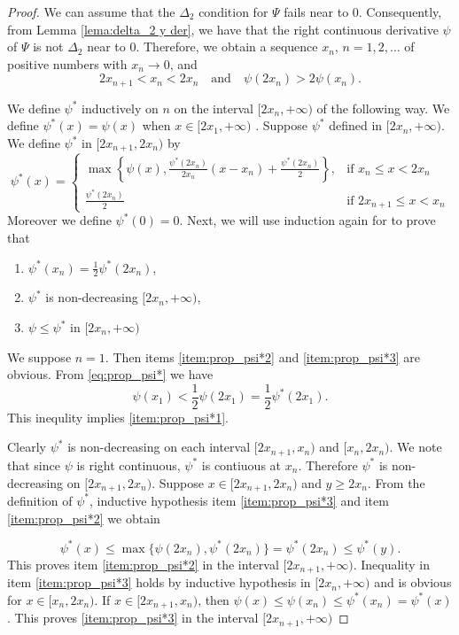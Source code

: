 \documentclass[twoside]{article}
\theoremstyle{remark}
\renewcommand{\leq}{\leqslant}
\renewcommand{\geq}{\geqslant}
\begin{document}
\begin{proof} We can assume that the $\Delta_2$ condition for $\Psi$ fails near to $0$. Consequently, from Lemma \ref{lema:delta_2 y der}, we have that the right continuous derivative $\psi$ of $\Psi$ is not $\Delta_2$ near to $0$. Therefore, we obtain a sequence $x_n$, $n=1,2,\ldots$ of positive numbers with $x_n\to 0$, and
\begin{equation}\label{eq:prop_psi*}2x_{n+1}<x_n<2x_n\quad\text{and}\quad \psi(2x_n)> 2\psi(x_n).
 \end{equation}

We define $\psi^*$ inductively on $n$ on the interval $[2x_n,+\infty)$ of the following way.   We define $\psi^*(x)=\psi(x)$ when  $x\in[ 2x_1,+\infty) $ . Suppose $\psi^*$ defined in $[2x_n,+\infty)$. We define $\psi^*$ in $[2x_{n+1},2x_n)$ by
\[
 \psi^*(x)=\left\{
\begin{array}{cc}
  \max\left\{\psi(x),\frac{\psi^*(2x_n)}{2x_n}(x-x_n)+\frac{ \psi^*(2x_n)}{2}\right\},& \text{if } x_n\leq x<2x_n\\
   \frac{\psi^*(2x_n)}{2}& \text{if }2x_{n+1} \leq x<x_n
  \end{array}
\right.
\]
Moreover we define $\psi^*(0)=0$. Next, we will use induction again for to prove that
\begin{enumerate}
 \item\label{item:prop_psi*1} $\psi^*(x_n)=\frac12\psi^*(2x_n)$,
 \item\label{item:prop_psi*2}  $\psi^*$ is non-decreasing $[2x_{n},+\infty)$,
 \item\label{item:prop_psi*3}   $\psi\leq \psi^*$ in  $[2x_{n},+\infty)$
\end{enumerate}

We suppose $n=1$. Then items \ref{item:prop_psi*2} and \ref{item:prop_psi*3} are obvious. From \eqref{eq:prop_psi*} we have
\[\psi(x_1)<\frac12\psi(2x_1)=\frac12\psi^*(2x_1).\]
This inequlity implies \ref{item:prop_psi*1}.

 Clearly $\psi^*$ is non-decreasing on each interval $[2x_{n+1},x_n)$ and $[x_n,2x_n)$. We note that since $\psi$ is right continuous, $\psi^*$ is contiuous at $x_n$. Therefore $\psi^*$ is non-decreasing on $[2x_{n+1},2x_n)$. Suppose $x\in[2x_{n+1},2x_n)$ and $y\geq 2x_n$.  From the definition of $\psi^*$, inductive hypothesis item \ref{item:prop_psi*3} and item \ref{item:prop_psi*2} we obtain

\[\psi^*(x)\leq\max\{\psi(2x_n),\psi^*(2x_n)\}=\psi^*(2x_n)\leq\psi^*(y).\]
This proves item \ref{item:prop_psi*2} in the interval $[2x_{n+1},+\infty)$.
Inequality in item \ref{item:prop_psi*3} holds by inductive hypothesis in $[2x_n,+\infty)$ and  is obvious for  $x\in[x_n,2x_n)$. If $ x\in[2x_{n+1},x_n)$, then $\psi(x)\leq\psi(x_n)\leq\psi^*(x_n)=\psi^*(x)$. This proves  \ref{item:prop_psi*3} in the interval $[2x_{n+1},+\infty)$


\end{proof}
\end{document}
